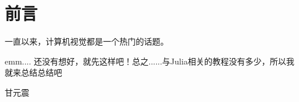 \chapter*{前言}


一直以来，计算机视觉都是一个热门的话题。

emm.... 还没有想好，就先这样吧！总之......与Julia相关的教程没有多少，所以我就来总结总结吧~

\vskip 1.5cm

\begin{flushright}
甘元震\\
\releasedate
\end{flushright}

